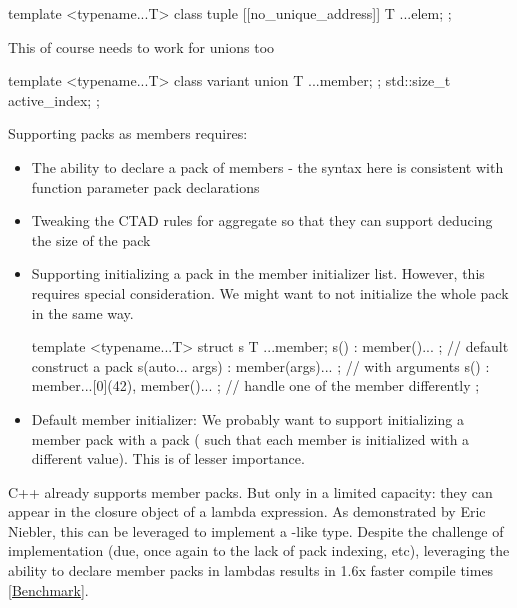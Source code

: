 \documentclass{wg21}
\begin{document}
\begin{colorblock}
template <typename...T>
class tuple {
    [[no_unique_address]] T ...elem;
};
\end{colorblock}

This of course needs to work for unions too

\begin{colorblock}
template <typename...T>
class variant {
    union {
        T ...member;
    };
    std::size_t active_index;
};
\end{colorblock}

Supporting packs as members requires:

\begin{itemize}
\item The ability to declare a pack of members - the syntax here is consistent with function parameter pack declarations
\item Tweaking the CTAD rules for aggregate so that they can support deducing the size of the pack
\item Supporting initializing a pack in the member initializer list. However, this requires special consideration. We might want to not initialize the whole pack in the same way.

\begin{colorblock}
template <typename...T>
struct s {
     T ...member;
     s() : member()... {}; // default construct a pack
     s(auto... args) : member(args)... {}; // with arguments
     s() : member...[0](42), member()... {}; // handle one of the member differently
};
\end{colorblock}

\item Default member initializer: We probably want to support initializing a member pack with a pack ( such that each member is initialized with a different value). This is of lesser importance.

\end{itemize}

C++ already supports member packs. But only in a limited capacity: they can appear in
the closure object of a lambda expression.
As demonstrated by Eric Niebler, this can be leveraged to implement a -like type.
Despite the challenge of implementation (due, once again to the lack of pack indexing, etc),
leveraging the ability to declare member packs in lambdas results in 1.6x faster compile times
\href{https://build-bench.com/b/xRgaBoiALe2hMmdYtiJnGCfePIA}{[Benchmark]}.
\end{document}
